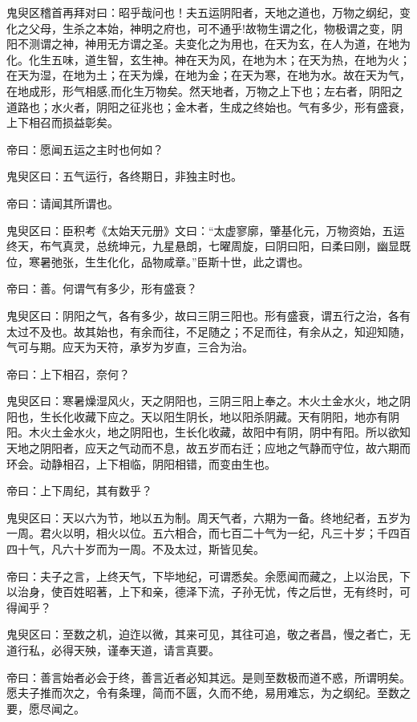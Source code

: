 \documentclass{article}%
\begin{document}
鬼臾区稽首再拜对曰：昭乎哉问也！夫五运阴阳者，天地之道也，万物之纲纪，变化之父母，生杀之本始，神明之府也，可不通乎!故物生谓之化，物极谓之变，阴阳不测谓之神，神用无方谓之圣。夫变化之为用也，在天为玄，在人为道，在地为化。化生五味，道生智，玄生神。神在天为风，在地为木；在天为热，在地为火；在天为湿，在地为土；在天为燥，在地为金；在天为寒，在地为水。故在天为气，在地成形，形气相感,而化生万物矣。然天地者，万物之上下也；左右者，阴阳之道路也；水火者，阴阳之征兆也；金木者，生成之终始也。气有多少，形有盛衰，上下相召而损益彰矣。

帝曰：愿闻五运之主时也何如？

鬼臾区曰：五气运行，各终期日，非独主时也。

帝曰：请闻其所谓也。

鬼臾区曰：臣积考《太始天元册》文曰：“太虚寥廓，肇基化元，万物资始，五运终天，布气真灵，总统坤元，九星悬朗，七曜周旋，曰阴曰阳，曰柔曰刚，幽显既位，寒暑弛张，生生化化，品物咸章。”臣斯十世，此之谓也。

帝曰：善。何谓气有多少，形有盛衰？

鬼臾区曰：阴阳之气，各有多少，故曰三阴三阳也。形有盛衰，谓五行之治，各有太过不及也。故其始也，有余而往，不足随之；不足而往，有余从之，知迎知随，气可与期。应天为天符，承岁为岁直，三合为治。

帝曰：上下相召，奈何？

鬼臾区曰：寒暑燥湿风火，天之阴阳也，三阴三阳上奉之。木火土金水火，地之阴阳也，生长化收藏下应之。天以阳生阴长，地以阳杀阴藏。天有阴阳，地亦有阴阳。木火土金水火，地之阴阳也，生长化收藏，故阳中有阴，阴中有阳。所以欲知天地之阴阳者，应天之气动而不息，故五岁而右迁；应地之气静而守位，故六期而环会。动静相召，上下相临，阴阳相错，而变由生也。

帝曰：上下周纪，其有数乎？

鬼臾区曰：天以六为节，地以五为制。周天气者，六期为一备。终地纪者，五岁为一周。君火以明，相火以位。五六相合，而七百二十气为一纪，凡三十岁；千四百四十气，凡六十岁而为一周。不及太过，斯皆见矣。

帝曰：夫子之言，上终天气，下毕地纪，可谓悉矣。余愿闻而藏之，上以治民，下以治身，使百姓昭著，上下和亲，德泽下流，子孙无忧，传之后世，无有终时，可得闻乎？

鬼臾区曰：至数之机，迫迮以微，其来可见，其往可追，敬之者昌，慢之者亡，无道行私，必得天殃，谨奉天道，请言真要。

帝曰：善言始者必会于终，善言近者必知其远。是则至数极而道不惑，所谓明矣。愿夫子推而次之，令有条理，简而不匮，久而不绝，易用难忘，为之纲纪。至数之要，愿尽闻之。
\end{document}
